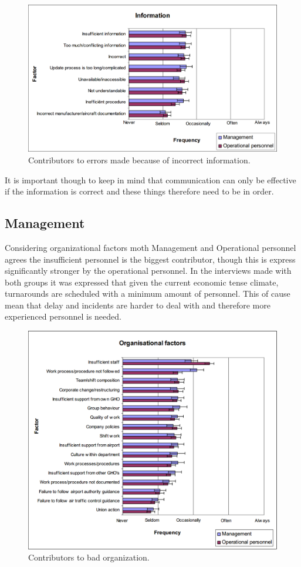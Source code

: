 \begin{figure}[H]
\centering
\includegraphics[width=\textwidth]{Grafik/Information}
\caption{Contributors to errors made because of incorrect information.}
\label{Information}
\end{figure}

It is important though to keep in mind that communication can only be effective if the information is correct and these things therefore need to be in order.

\subsection{Management}
Considering organizational factors moth Management and Operational personnel agrees the insufficient personnel is the biggest contributor, though this is express significantly stronger by the operational personnel. In the interviews made with both groups it was expressed that given the current economic tense climate, turnarounds are scheduled with a minimum amount of personnel. This of cause mean that delay and incidents are harder to deal with and therefore more experienced personnel is needed.

\begin{figure}[H]
\centering
\includegraphics[width=\textwidth]{Grafik/OrganisationalFactors}
\caption{Contributors to bad organization.}
\label{OrganisationalFactors}
\end{figure}

